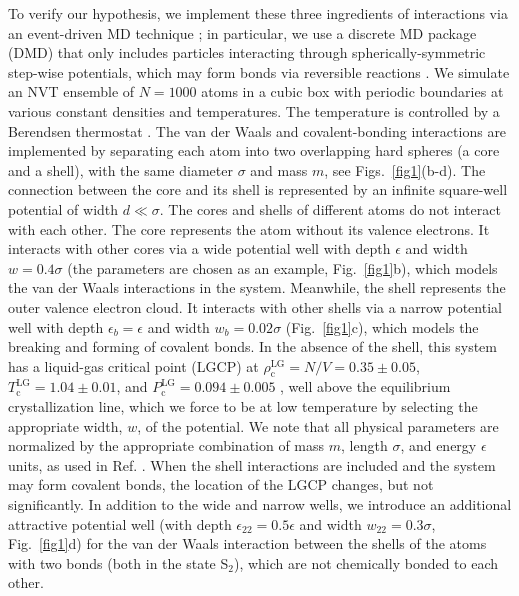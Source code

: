 \documentclass[9pt,twocolumn,twoside,lineno]{pnas-new}
\begin{document}
To verify our hypothesis, we implement these three ingredients of interactions via an event-driven MD technique \cite{Alder1959,Rapaport2004}; in particular, we use a discrete MD package (DMD) that only includes particles interacting through spherically-symmetric step-wise potentials, which may form bonds via reversible reactions \cite{Buldyrev_Application_2008}. We simulate an NVT ensemble of $N=1000$ atoms in a cubic box with periodic boundaries at various constant densities and temperatures. The temperature is controlled by a Berendsen thermostat \cite{Berendsen1984}. The van der Waals and covalent-bonding interactions are implemented by separating each atom into two overlapping hard spheres (a core and a shell), with the same diameter $\sigma$ and mass $m$, see Figs.~\ref{fig1}(b-d). The connection between the core and its shell is represented by an infinite square-well potential of width $d\ll\sigma$. The cores and shells of different atoms do not interact with each other. The core represents the atom without its valence electrons. It interacts with other cores via a wide potential well with depth $\epsilon$ and width $w = 0.4\sigma$ (the parameters are chosen as an example, Fig.~\ref{fig1}b), which models the van der Waals interactions in the system. Meanwhile, the shell represents the outer valence electron cloud. It interacts with other shells via a narrow potential well with depth $\epsilon_b = \epsilon$ and width $w_b=0.02\sigma$ (Fig.~\ref{fig1}c), which models the breaking and forming of covalent bonds. In the absence of the shell, this system has a liquid-gas critical point (LGCP) at $\rho_\text{c}^\text{LG}=N/V=0.35\pm0.05$, $T_\text{c}^\text{LG}=1.04\pm0.01$, and $P_\text{c}^\text{LG}=0.094\pm0.005$ \cite{Skibinsky2004}, well above the equilibrium crystallization line, which we force to be at low temperature by selecting the appropriate width, $w$, of the potential. We note that all physical parameters are normalized by the appropriate combination of mass $m$, length $\sigma$, and energy $\epsilon$ units, as used in Ref. \cite{Skibinsky2004}. When the shell interactions are included and the system may form covalent bonds, the location of the LGCP changes, but not significantly. In addition to the wide and narrow wells, we introduce an additional attractive potential well (with depth $\epsilon_{22}=0.5\epsilon$ and width $w_{22}=0.3\sigma$, Fig.~\ref{fig1}d) for the van der Waals interaction between the shells of the atoms with two bonds (both in the state S$_2$), which are not chemically bonded to each other.
\end{document}
